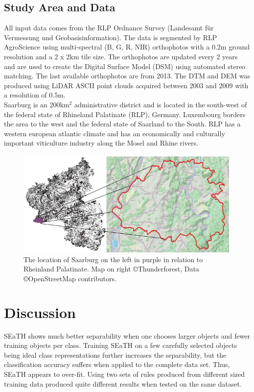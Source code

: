 \documentclass[authoryear, review,12pt,number]{elsarticle}
\begin{document}
\subsection{Study Area and Data}
All input data comes from the RLP Ordnance Survey (Landesamt f\"ur Vermessung
und Geobasisinformation). The data is segmented by RLP AgroScience using
multi-spectral (B, G, R, NIR) orthophotos with a 0.2m ground resolution and a 2
x 2km tile size. The orthophotos are updated every 2 years and are used to
create the Digital Surface Model (DSM) using automated stereo matching. The
last available orthophotos are from 2013. The DTM and DEM was produced using
LiDAR ASCII point clouds acquired between 2003 and 2009 with a resolution of
0.5m.\\
Saarburg is an 200km$^{2}$ administrative district and is located in the
south-west of the federal state of Rhineland Palatinate (RLP), Germany.
Luxembourg borders the area to the west and the federal state of Saarland to
the South.  RLP has a western european atlantic climate and has an economically
and culturally important viticulture industry along the Mosel and Rhine rivers.
\begin{figure}
\label{fig_study_area}
    \includegraphics[width=\textwidth]{diagrams/study_area_closeup.png}
    \caption{The location of Saarburg on the left in purple in relation to
    Rheinland Palatinate. Map on right \copyright Thunderforest, Data
\copyright OpenStreetMap contributors.}
\end{figure}

\section{Discussion} SEaTH shows much better separability when one chooses
larger objects and fewer training objects per class. Training SEaTH on a few
carefully selected objects being ideal class representations further increases
the separability, but the classification accuracy suffers when applied to the
complete data set. Thus, SEaTH appears to over-fit. Using two sets of rules
produced from different sized training data produced quite different results
when tested on the same dataset.
\end{document}
